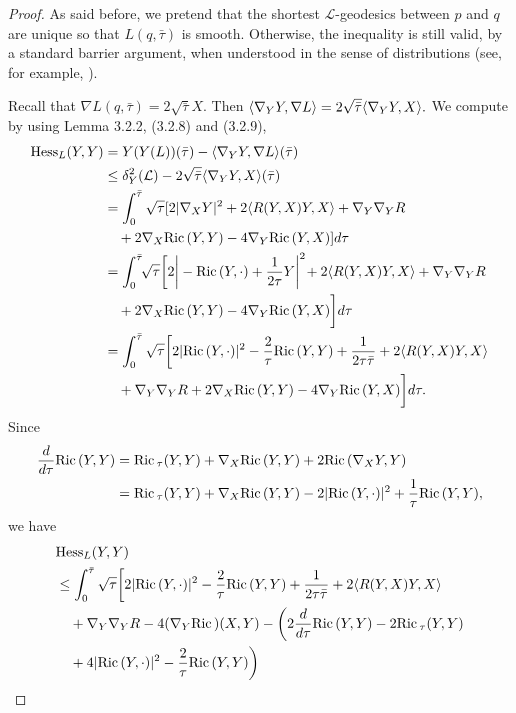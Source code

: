 \begin{proof}
As said before, we pretend that the shortest
$\mathcal{L}$-geodesics between $p$ and $q$ are unique so that
$L(q,\bar{\tau})$ is smooth. Otherwise, the inequality is still
valid, by a standard barrier argument, when understood in the
sense of distributions (see, for example, \cite{ScY}).

Recall that $\nabla L(q,\bar{\tau})=2\sqrt{\bar{\tau}}X$. Then
$\langle\nabla_YY,\nabla L\rangle=2\sqrt{\bar{\tau}}\langle\nabla_YY,X\rangle.$ We
compute by using Lemma 3.2.2, (3.2.8) and (3.2.9),
\begin{align*}
{\rm Hess}_L(Y,Y)&  = Y(Y(L))(\bar{\tau})-\langle\nabla_YY,\nabla
L\rangle(\bar\tau)\\
& \leq \delta_Y^2({\mathcal{L}})-2\sqrt{\bar{\tau}}
\langle\nabla_YY,X\rangle(\bar\tau)\\
&  = \int_0^{\bar{\tau}}\sqrt{\tau}[2 |\nabla_XY|^2
+2\langle R(Y,X)Y,X\rangle+\nabla_Y\nabla_YR\\
&\quad +2\nabla_X{{\rm Ric}\,}(Y,Y)-4\nabla_Y{{\rm Ric}\,}(Y,X)]d\tau\\
&  = \int_0^{\bar{\tau}}\!\!\sqrt{\tau}\bigg[2
\bigg|-{\rm Ric}\,(Y,\cdot)
+\frac{1}{2\tau}Y\bigg|^2\!+2\langle R(Y,X)Y,X\rangle+\nabla_Y\nabla_YR\\
&\quad +2\nabla_X {\rm Ric}\,(Y,Y)-4\nabla_Y {\rm Ric}\,(Y,X)\bigg]d\tau\\
& =\int_0^{\bar{\tau}}\sqrt{\tau}\bigg[2|{\rm Ric}\,(Y,\cdot)|^2
-\frac{2}{\tau}{\rm Ric}\,(Y,Y)
+\frac{1}{2\tau\bar{\tau}}+2\langle R(Y,X)Y,X\rangle\\
&\quad +\nabla_Y\nabla_YR+2\nabla_X {\rm Ric}\,(Y,Y)-4\nabla_Y
{\rm Ric}\,(Y,X)\bigg]d\tau.
\end{align*}
Since
\begin{align*}
\frac{d}{d\tau}{\rm Ric}\,(Y,Y)
&  ={\rm Ric}\,_\tau(Y,Y)+\nabla_X {\rm Ric}\,(Y,Y)+2{\rm Ric}\,(\nabla_XY,Y)\\
&  = {\rm Ric}\,_\tau(Y,Y)+\nabla_X
{\rm Ric}\,(Y,Y)-2|{\rm Ric}\,(Y,\cdot)|^2+\frac{1}{\tau}{\rm Ric}\,(Y,Y),
\end{align*}
we have
\begin{align*}
&{\rm Hess}_L(Y,Y) \\
& \leq\int_0^{\bar{\tau}}\sqrt{\tau}\bigg[2|\Ric(Y,\cdot)|^2
-\frac{2}{\tau}\Ric(Y,Y)+\frac{1}{2\tau\bar{\tau}}
+2\langle R(Y,X)Y,X\rangle\\
&\quad +\nabla_Y\nabla_YR-4(\nabla_Y \Ric)(X,Y)
-\bigg(2\frac{d}{d\tau}\Ric(Y,Y)-2\Ric_\tau(Y,Y)\\
&\quad +4|\Ric(Y,\cdot)|^2-\frac{2}{\tau}\Ric(Y,Y)\bigg)

\end{align*}
\end{proof}
